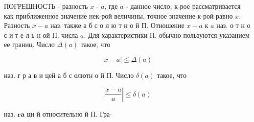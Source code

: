 \documentclass[10pt]{article}
\begin{document}
ПОГРЕШНОСТЬ - разность $x$ - $a$, где $a$ - данное число, к-рое рассматривается как приближенное значение нек-рой величины, точное значение к-рой равно $x$. Разность $x-a$ наз. также а б с о л ю т н о й П. Отношение $x-a$ к $a$ наз. о т н о с и т е л ь н ой П. числа $a$. Для характеристики П. обычно пользуются указанием ее границ. Число $\Delta(a)$ такое, что



\[

|x-a| \leqslant \Delta(a)

\]



наз. г р а в и цей а б с олютн о й П. Число $\delta(a)$ такое, что



\[

\left|\frac{x-a}{a}\right| \leqslant \delta(a)

\]



наз. $\boldsymbol{r} \mathbf{a}$ ци й относительно й П. Гра-
\end{document}
